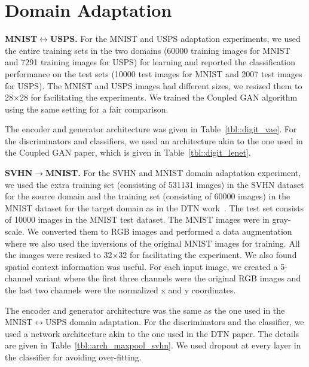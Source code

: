 \documentclass{article}
\begin{document}
\section{Domain Adaptation}\label{app::domain}

{\bf MNIST$\leftrightarrow$USPS.} For the MNIST and USPS adaptation experiments, we used the entire training sets in the two domains (60000 training images for MNIST and 7291 training images for USPS) for learning and reported the classification performance on the test sets (10000 test images for MNIST and 2007 test images for USPS). The MNIST and USPS images had different sizes, we resized them to 28$\times$28 for facilitating the experiments. We trained the Coupled GAN algorithm~\cite{liu2016coupled} using the same setting for a fair comparison. 

The encoder and generator architecture was given in Table~\ref{tbl::digit_vae}. For the discriminators and classifiers, we used an architecture akin to the one used in the Coupled GAN paper, which is given in Table~\ref{tbl::digit_lenet}.

{\bf SVHN$\rightarrow$MNIST.} For the SVHN and MNIST domain adaptation experiment, we used the extra training set (consisting of 531131 images) in the SVHN dataset for the source domain and the training set (consisting of 60000 images) in the MNIST dataset for the target domain as in the DTN work~\cite{taigman2016unsupervised}. The test set consists of 10000 images in the MNIST test dataset. The MNIST images were in gray-scale. We converted them to RGB images and performed a data augmentation where we also used the inversions of the original MNIST images for training. All the images were resized to 32$\times$32 for facilitating the experiment. We also found spatial context information was useful. For each input image, we created a 5-channel variant where the first three channels were the original RGB images and the last two channels were the normalized x and y coordinates.

The encoder and generator architecture was the same as the one used in the MNIST$\leftrightarrow$USPS domain adaptation. For the discriminators and the classifier, we 
used a network architecture akin to the one used in the DTN paper. The details are given in Table~\ref{tbl::arch_maxpool_svhn}. We used dropout at every layer in the classifier for avoiding over-fitting.
\end{document}

